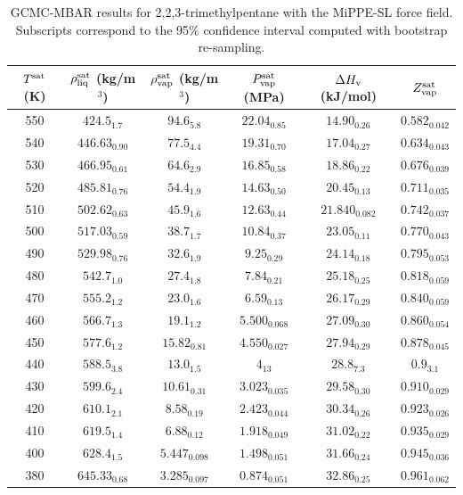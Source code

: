 \documentclass[journal=jctc,manuscript=article]{achemso}
\begin{document}
\begin{table}[htb!]
	\caption{GCMC-MBAR results for 2,2,3-trimethylpentane with the MiPPE-SL force field. Subscripts correspond to the 95\% confidence interval computed with bootstrap re-sampling.}
	\begin{center}
		\begin{tabular}{|c|c|c|c|c|c|}
			\hline
			$T^{\rm sat}$ (K) & $\rho_{\rm liq}^{\rm sat}$ (kg/m$^3$) & $\rho_{\rm vap}^{\rm sat}$ (kg/m$^3$) & $P_{\rm vap}^{\rm sat}$ (MPa) & $\Delta H_{\rm v}$ (kJ/mol) & $Z_{\rm vap}^{\rm sat}$ \\ \hline
			550 & $424.5_{1.7}$ & $94.6_{5.8}$ & $22.04_{0.85}$ & $14.90_{0.26}$ & $0.582_{0.042}$ \\
			540 & $446.63_{0.90}$ & $77.5_{4.4}$ & $19.31_{0.70}$ & $17.04_{0.27}$ & $0.634_{0.043}$ \\
			530 & $466.95_{0.61}$ & $64.6_{2.9}$ & $16.85_{0.58}$ & $18.86_{0.22}$ & $0.676_{0.039}$ \\
			520 & $485.81_{0.76}$ & $54.4_{1.9}$ & $14.63_{0.50}$ & $20.45_{0.13}$ & $0.711_{0.035}$ \\
			510 & $502.62_{0.63}$ & $45.9_{1.6}$ & $12.63_{0.44}$ & $21.840_{0.082}$ & $0.742_{0.037}$ \\
			500 & $517.03_{0.59}$ & $38.7_{1.7}$ & $10.84_{0.37}$ & $23.05_{0.11}$ & $0.770_{0.043}$ \\
			490 & $529.98_{0.76}$ & $32.6_{1.9}$ & $9.25_{0.29}$ & $24.14_{0.18}$ & $0.795_{0.053}$ \\
			480 & $542.7_{1.0}$ & $27.4_{1.8}$ & $7.84_{0.21}$ & $25.18_{0.25}$ & $0.818_{0.059}$ \\
			470 & $555.2_{1.2}$ & $23.0_{1.6}$ & $6.59_{0.13}$ & $26.17_{0.29}$ & $0.840_{0.059}$ \\
			460 & $566.7_{1.3}$ & $19.1_{1.2}$ & $5.500_{0.068}$ & $27.09_{0.30}$ & $0.860_{0.054}$ \\
			450 & $577.6_{1.2}$ & $15.82_{0.81}$ & $4.550_{0.027}$ & $27.94_{0.29}$ & $0.878_{0.045}$ \\
			440 & $588.5_{3.8}$ & $13.0_{1.5}$ & $4_{13}$ & $28.8_{7.3}$ & $0.9_{3.1}$ \\
			430 & $599.6_{2.4}$ & $10.61_{0.31}$ & $3.023_{0.035}$ & $29.58_{0.30}$ & $0.910_{0.029}$ \\
			420 & $610.1_{2.1}$ & $8.58_{0.19}$ & $2.423_{0.044}$ & $30.34_{0.26}$ & $0.923_{0.026}$ \\
			410 & $619.5_{1.4}$ & $6.88_{0.12}$ & $1.918_{0.049}$ & $31.02_{0.22}$ & $0.935_{0.029}$ \\
			400 & $628.4_{1.5}$ & $5.447_{0.098}$ & $1.498_{0.051}$ & $31.66_{0.24}$ & $0.945_{0.036}$ \\
			380 & $645.33_{0.68}$ & $3.285_{0.097}$ & $0.874_{0.051}$ & $32.86_{0.25}$ & $0.961_{0.062}$ \\
			\hline
		\end{tabular}
	\end{center}
\end{table}
\end{document}
